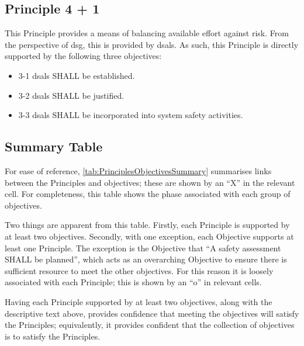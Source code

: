 \subsection{Principle 4 + 1}

This Principle provides a means of balancing available effort against risk. From the perspective of \gls{dsg}, this is provided by \glspl{dsal}. As such, this Principle is directly supported by the following three objectives:

\begin{itemize}
	\item \textcolor{dsiwgAccentColour}{3-1} \Glspl{dsal} SHALL be established.
	\item \textcolor{dsiwgAccentColour}{3-2} \Glspl{dsal} SHALL be justified.
	\item \textcolor{dsiwgAccentColour}{3-3} \Glspl{dsal} SHALL be incorporated into system safety activities.
\end{itemize}


\subsection{Summary Table}

For ease of reference, \autoref{tab:PrinciplesObjectivesSummary} summarises links between the Principles and objectives; these are shown by an ``X'' in the relevant cell. For completeness, this table shows the phase associated with each group of objectives. 

Two things are apparent from this table. Firstly, each Principle is supported by at least two objectives. Secondly, with one exception, each Objective supports at least one Principle. The exception is the Objective that ``A \gls{safety assessment} SHALL be planned'', which acts as an overarching Objective to ensure there is sufficient resource to meet the other objectives. For this reason it is loosely associated with each Principle; this is shown by an ``o'' in relevant cells.

Having each Principle supported by at least two objectives, along with the descriptive text above, provides confidence that meeting the objectives will satisfy the Principles; equivalently, it provides confident that the collection of objectives is  to satisfy the Principles. 

